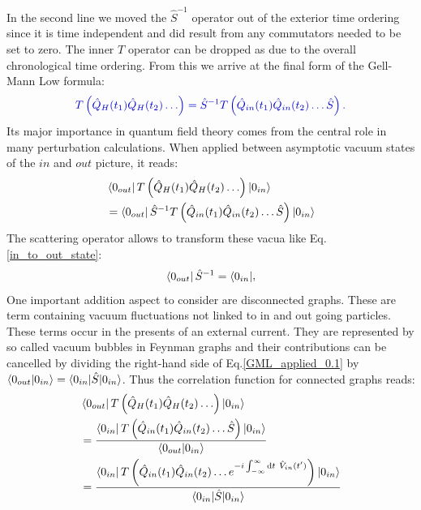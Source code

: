 \documentclass[12pt, titlepage]{article}
\begin{document}
In the second line we moved the $ \hat{S}^{-1} $ operator out of the exterior time ordering since it is time independent and did result from any commutators needed to be set to zero. The inner $ T $ operator can be dropped as due to the overall chronological time ordering.  
From this we arrive at the final form of the Gell-Mann Low formula:
\begin{equation}\label{Gell-Mann_Low_formula}
\textcolor[RGB]{0,0,204}{
T\left( 
\hat{Q}_{H}(t_1)
\hat{Q}_{H}(t_2)
\ldots
\right) 
=
\hat{S}^{-1}
T\left( 
\hat{Q}_{in}(t_{1})
\hat{Q}_{in}(t_{2})
\ldots
\hat{S}
\right).
}
\end{equation}
Its major importance in quantum field theory comes from the central role in many perturbation calculations. When applied between asymptotic vacuum states of the $ in $ and $ out $ picture, it reads:
\begin{equation}\label{GML_applied_0.1}
\begin{split}
&\bra{0_{out}}
T\left( 
\hat{Q}_{H}(t_1)
\hat{Q}_{H}(t_2)
\ldots
\right) 
\ket{0_{in}}
\\
&=
\bra{0_{out}}
\hat{S}^{-1}
T\left( 
\hat{Q}_{in}(t_{1})
\hat{Q}_{in}(t_{2})
\ldots
\hat{S}
\right)
\ket{0_{in}}
\end{split}
\end{equation}
The scattering operator allows to transform these vacua like Eq.\enskip\eqref{in_to_out_state}:
\begin{equation}\label{S_on_state}
\begin{split}
\bra{0_{out}}
\hat{S}^{-1}
=
\bra{0_{in}}
\end{split},
\end{equation}
One important addition aspect to consider are disconnected graphs. These are term containing vacuum fluctuations not linked to in and out going particles. These terms occur in the presents of an external current. They are represented by so called vacuum bubbles in Feynman graphs and their contributions can be cancelled by dividing the right-hand side of Eq.\enskip\eqref{GML_applied_0.1} by $ \braket{0_{out}|0_{in}} = \braket{0_{in}|\hat{S}|0_{in}} $. Thus the correlation function for connected graphs reads:
\begin{equation}\label{GML_applied_1}
\begin{split}
&\bra{0_{out}}
T\left( 
\hat{Q}_{H}(t_1)
\hat{Q}_{H}(t_2)
\ldots
\right) 
\ket{0_{in}}
\\
&=\dfrac{
\bra{0_{in}}
T\left( 
\hat{Q}_{in}(t_{1})
\hat{Q}_{in}(t_{2})
\ldots
\hat{S}
\right)
\ket{0_{in}}
}{\braket{0_{out}|0_{in}}}
\\
&=\dfrac{
\bra{0_{in}}
T\left( 
\hat{Q}_{in}(t_{1})
\hat{Q}_{in}(t_{2})
\ldots
e^{-i\int_{-\infty}^{\infty}\mathrm{d}t\ \hat{V}_{in}(t^{\prime})}
\right)
\ket{0_{in}}
}{\braket{0_{in}|\hat{S}|0_{in}}}
\end{split}
\end{equation}
\end{document}
